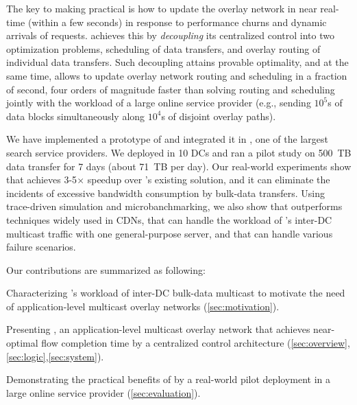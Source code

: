 The key to making \name practical is how to update the overlay
network in near real-time (within a few seconds) in response to
performance churns and dynamic arrivals of requests. \name achieves
this by {\em decoupling} its centralized control into two
optimization problems, scheduling of data transfers, and overlay
routing of individual data transfers. Such decoupling attains
provable optimality, and at the same time, allows \name to update
overlay network routing and scheduling in a fraction of second, four
orders of magnitude faster than solving routing and scheduling jointly
with the workload of a large online service provider (e.g., sending
$10^5$s of data blocks simultaneously along $10^4$s of disjoint
overlay paths).


We have implemented a prototype of \name and integrated it in
\company, one of the largest search service providers. We deployed
\name in 10 DCs and ran a pilot study on 500~TB data transfer
for 7 days (about 71~TB per day).
Our real-world experiments show that \name achieves 3-5$\times$
speedup over \company's existing solution, and it can eliminate the
incidents of excessive bandwidth consumption by bulk-data transfers.
Using trace-driven simulation and microbanchmarking, we also show
that \name outperforms techniques widely used in CDNs, that \name
can handle the workload of \company's inter-DC multicast traffic with
one general-purpose server, and that \name can handle various
failure scenarios.


Our contributions are summarized as following:
\begin{packeditemize}
\item Characterizing \company's workload of inter-DC bulk-data
multicast to motivate the need of application-level multicast
overlay networks (\Section\ref{sec:motivation}).
\item Presenting \name, an application-level multicast overlay
network that achieves near-optimal flow completion time by a
centralized control architecture
(\Section\ref{sec:overview},\ref{sec:logic},\ref{sec:system}).
\item Demonstrating the practical benefits of \name by a real-world
pilot deployment in a large online service provider
(\Section\ref{sec:evaluation}).
\end{packeditemize}
